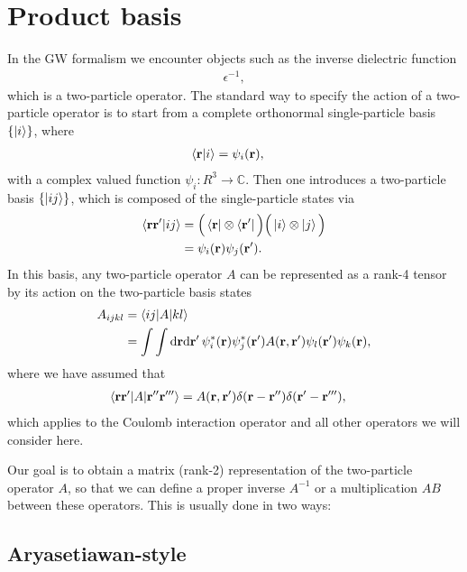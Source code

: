 \documentclass[12pt,a4paper]{scrartcl}
\numberwithin{equation}{section}
\renewcommand{\vec}{\mathbf}
\begin{document}
\section{Product basis}
In the GW formalism we encounter objects such as the inverse dielectric function
\begin{align}
 \epsilon^{-1},
\end{align}
which is a two-particle operator. The standard way to specify the action of a two-particle operator
is to start from a complete orthonormal single-particle basis $\{ \ket{i} \}$, where
\begin{align}
 \braket{\vec{r} | i} &= \psi_i(\vec{r}),
\end{align}
with a complex valued function $\psi_i: R^3\rightarrow \mathbb{C}$.
Then one introduces a two-particle basis $\{ \ket{ij} \}$, which is composed of the single-particle states via
\begin{align}
\braket{\vec{r}\vec{r}' | ij} 
&= \Big( \bra{\vec{r}} \otimes \bra{\vec{r}'} \Big) \Big( \ket{i} \otimes \ket{j} \Big) \\
&= \psi_i(\vec{r})\psi_j(\vec{r}').
\end{align}
In this basis, any two-particle operator $A$ can be represented as a rank-4 tensor
by its action on the two-particle basis states
\begin{align}
A_{ijkl} &= \braket{ij | A | kl }  \\
&= \int \int \mathrm{d}\vec{r}\mathrm{d}\vec{r}' \, \psi^*_i(\vec{r})\psi^*_j(\vec{r}') 
                                          A(\vec{r},\vec{r}') \psi_l(\vec{r}')\psi_k(\vec{r}),
\end{align}
where we have assumed that 
\begin{align}
 \braket{\vec{r}\vec{r}' | A | \vec{r}''\vec{r}''' }
 &= A(\vec{r},\vec{r}') \delta(\vec{r}-\vec{r}'') \delta(\vec{r}'-\vec{r}'''),
\end{align}
which applies to the Coulomb interaction operator and all other operators we will consider here.

Our goal is to obtain a matrix (rank-2) representation of the two-particle operator $A$, so that we can 
define a proper inverse $A^{-1}$ or a multiplication $AB$ between these operators. 
This is usually done in two ways:

\subsection{Aryasetiawan-style}
\end{document}
